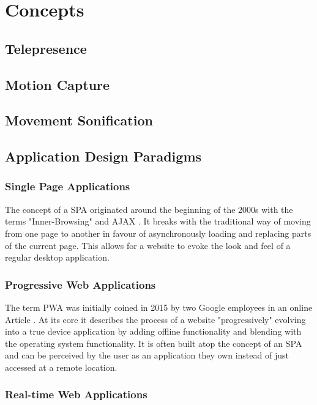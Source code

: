 \chapter{Concepts}

\section{Telepresence}

\section{Motion Capture}

\section{Movement Sonification}

\section{Application Design Paradigms}

\subsection{Single Page Applications}

The concept of a \ac{SPA} originated around the beginning of the 2000s with the terms "Inner-Browsing" \parencite{innerBrowsing} and \ac{AJAX} \parencite{ajaxNewApproach}. It breaks with the traditional way of moving from one page to another in favour of asynchronously loading and replacing parts of the current page. This allows for a website to evoke the look and feel of a regular desktop application.

\subsection{Progressive Web Applications}

The term \ac{PWA} was initially coined in 2015 by two Google employees in an online Article \parencite{progressiveWebApplications}. At its core it describes the process of a website "progressively" evolving into a true device application by adding offline functionality and blending with the operating system functionality. It is often built atop the concept of an \ac{SPA} and can be perceived by the user as an application they own instead of just accessed at a remote location.

\subsection{Real-time Web Applications}

